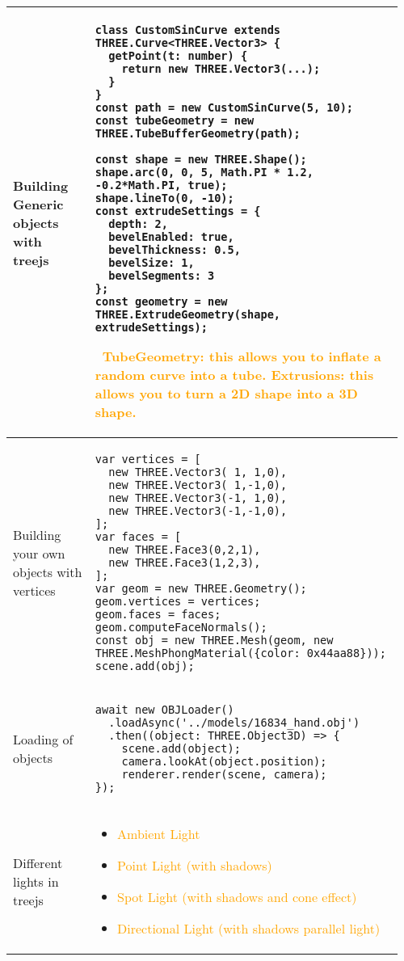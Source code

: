 \documentclass[main.tex,fontsize=8pt,paper=a4,paper=portrait,DIV=calc,]{scrartcl}
\begin{document}
\begin{table}[ht!]
\begin{tabular}{|m{0.2\linewidth}|m{0.755\linewidth}|}
\hline
Building Generic objects with treejs & 
\begin{lstlisting}
class CustomSinCurve extends THREE.Curve<THREE.Vector3> {
  getPoint(t: number) {
    return new THREE.Vector3(...);
  }
}
const path = new CustomSinCurve(5, 10);
const tubeGeometry = new THREE.TubeBufferGeometry(path);

const shape = new THREE.Shape();
shape.arc(0, 0, 5, Math.PI * 1.2, -0.2*Math.PI, true);
shape.lineTo(0, -10);
const extrudeSettings = {
  depth: 2,
  bevelEnabled: true,
  bevelThickness: 0.5,
  bevelSize: 1,
  bevelSegments: 3
};
const geometry = new THREE.ExtrudeGeometry(shape, extrudeSettings);
\end{lstlisting} 
\, \newline
\textcolor{orange}{TubeGeometry: this allows you to inflate a random curve into a tube.}\newline
\textcolor{orange}{Extrusions: this allows you to turn a 2D shape into a 3D shape.}\\
\hline
Building your own objects with vertices & 
\begin{lstlisting}
var vertices = [
  new THREE.Vector3( 1, 1,0),
  new THREE.Vector3( 1,-1,0),
  new THREE.Vector3(-1, 1,0),
  new THREE.Vector3(-1,-1,0),
];
var faces = [
  new THREE.Face3(0,2,1),
  new THREE.Face3(1,2,3),
];
var geom = new THREE.Geometry();
geom.vertices = vertices;
geom.faces = faces;
geom.computeFaceNormals();
const obj = new THREE.Mesh(geom, new THREE.MeshPhongMaterial({color: 0x44aa88}));
scene.add(obj);
\end{lstlisting}\\
\hline
Loading of objects & 
\begin{lstlisting}
await new OBJLoader()
  .loadAsync('../models/16834_hand.obj')
  .then((object: THREE.Object3D) => {
    scene.add(object);
    camera.lookAt(object.position);
    renderer.render(scene, camera);
});
\end{lstlisting}\\
\hline
Different lights in treejs & 
\begin{itemize}
\item \textcolor{orange}{Ambient Light}
\item \textcolor{orange}{Point Light (with shadows)}
\item \textcolor{orange}{Spot Light (with shadows and cone effect)}
\item \textcolor{orange}{Directional Light (with shadows parallel light)}

\end{itemize}
\end{tabular}
\end{table}
\end{document}
